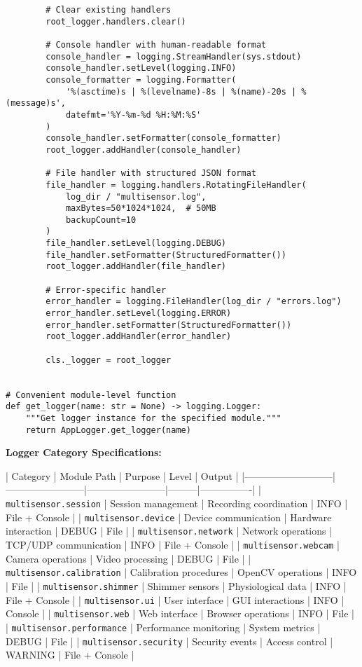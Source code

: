 \documentclass[12pt,a4paper]{article}
\begin{document}
\begin{verbatim}
        # Clear existing handlers
        root_logger.handlers.clear()
        
        # Console handler with human-readable format
        console_handler = logging.StreamHandler(sys.stdout)
        console_handler.setLevel(logging.INFO)
        console_formatter = logging.Formatter(
            '%(asctime)s | %(levelname)-8s | %(name)-20s | %(message)s',
            datefmt='%Y-%m-%d %H:%M:%S'
        )
        console_handler.setFormatter(console_formatter)
        root_logger.addHandler(console_handler)
        
        # File handler with structured JSON format
        file_handler = logging.handlers.RotatingFileHandler(
            log_dir / "multisensor.log",
            maxBytes=50*1024*1024,  # 50MB
            backupCount=10
        )
        file_handler.setLevel(logging.DEBUG)
        file_handler.setFormatter(StructuredFormatter())
        root_logger.addHandler(file_handler)
        
        # Error-specific handler
        error_handler = logging.FileHandler(log_dir / "errors.log")
        error_handler.setLevel(logging.ERROR)
        error_handler.setFormatter(StructuredFormatter())
        root_logger.addHandler(error_handler)
        
        cls._logger = root_logger


# Convenient module-level function
def get_logger(name: str = None) -> logging.Logger:
    """Get logger instance for the specified module."""
    return AppLogger.get_logger(name)
\end{verbatim}

\textbf{Logger Category Specifications:}

| Category                  | Module Path            | Purpose                | Level   | Output         |
|---------------------------|------------------------|------------------------|---------|----------------|
| \texttt{multisensor.session}     | Session management     | Recording coordination | INFO    | File + Console |
| \texttt{multisensor.device}      | Device communication   | Hardware interaction   | DEBUG   | File           |
| \texttt{multisensor.network}     | Network operations     | TCP/UDP communication  | INFO    | File + Console |
| \texttt{multisensor.webcam}      | Camera operations      | Video processing       | DEBUG   | File           |
| \texttt{multisensor.calibration} | Calibration procedures | OpenCV operations      | INFO    | File           |
| \texttt{multisensor.shimmer}     | Shimmer sensors        | Physiological data     | INFO    | File + Console |
| \texttt{multisensor.ui}          | User interface         | GUI interactions       | INFO    | Console        |
| \texttt{multisensor.web}         | Web interface          | Browser operations     | INFO    | File           |
| \texttt{multisensor.performance} | Performance monitoring | System metrics         | DEBUG   | File           |
| \texttt{multisensor.security}    | Security events        | Access control         | WARNING | File + Console |
\end{document}
